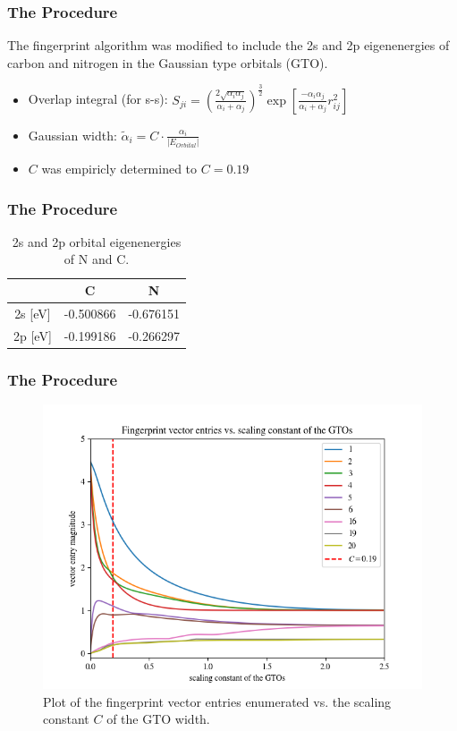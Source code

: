 \documentclass{beamer}
\begin{document}
\begin{frame}
  \frametitle{The Procedure}
  The fingerprint algorithm was modified to include the 2s and 2p eigenenergies of carbon and nitrogen in the Gaussian type orbitals (GTO).
  \begin{itemize}
    \item Overlap integral (for s-s): $S_{ji}=\left(\frac{2\sqrt{\alpha_i\alpha_j}}{\alpha_i+\alpha_j}\right)^\frac{3}{2}\exp\left[\frac{-\alpha_i\alpha_j}{\alpha_i+\alpha_j}r_{ij}^2\right]$
    \item Gaussian width: $\tilde{\alpha}_i=C\cdot\frac{\alpha_i}{\left|E_{Orbital}\right|}$
    \item $C$ was empiricly determined to $C=0.19$
  \end{itemize}
\end{frame}


\begin{frame}
  \frametitle{The Procedure}
  \begin{table}[h!]
\center
\label{table:energies}
\begin{tabular}{c|c|c}
            & \textbf{C} & \textbf{N} \\ \hline
2s {[}eV{]} & -0.500866  & -0.676151  \\ \hline
2p {[}eV{]} & -0.199186  & -0.266297 
\end{tabular}
\caption{2s and 2p orbital eigenenergies of N and C.}
\end{table}

\end{frame}

\begin{frame}
  \frametitle{The Procedure}
  \begin{figure}[h!]
    \includegraphics[scale=0.5]{Figures/fpentry.png}
    \caption{Plot of the fingerprint vector entries enumerated vs. the scaling constant $C$ of the GTO width.}
    \label{fig:const} 
  \end{figure}

\end{frame}
\end{document}
